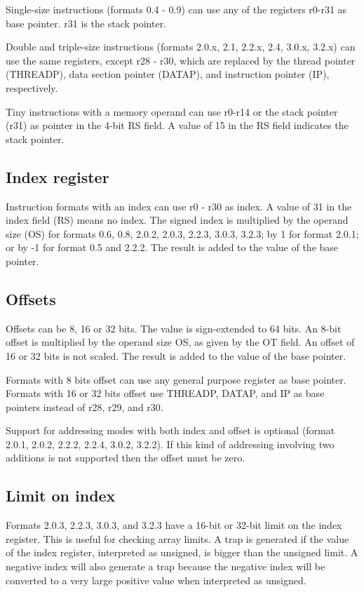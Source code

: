 \documentclass[forwardcom.tex]{subfiles}
\begin{document}
Single-size instructions (formats 0.4 - 0.9) can use any of the registers r0-r31 as base pointer. r31 is the stack pointer.
\vspace{2mm}

Double and triple-size instructions (formats 2.0.x, 2.1, 2.2.x, 2.4, 3.0.x, 3.2.x) can use the same registers, except r28 - r30,  which are replaced by the thread pointer (THREADP), data section pointer (DATAP), and instruction pointer (IP), respectively.
\vspace{2mm}

Tiny instructions with a memory operand can use r0-r14 or the stack pointer (r31) as pointer in the 4-bit RS field. A value of 15 in the RS field indicates the stack pointer.

\subsection{Index register}
Instruction formats with an index can use r0 - r30 as index. A value of 31 in the index field (RS) means no index. The signed index is multiplied by the operand size (OS) for formats 0.6, 0.8, 2.0.2, 2.0.3, 2.2.3, 3.0.3, 3.2.3; by 1 for format 2.0.1; or by -1 for format 0.5 and 2.2.2. The result is added to the value of the base pointer.

\subsection{Offsets}
Offsets can be 8, 16 or 32 bits. The value is sign-extended to 64 bits. An 8-bit offset is multiplied by the operand size OS, as given by the OT field. An offset of 16 or 32 bits is not scaled. The result is added to the value of the base pointer.
\vspace{2mm}

Formats with 8 bits offset can use any general purpose register as base pointer. Formats with 16 or
32 bits offset use THREADP, DATAP, and IP as base pointers instead of r28, r29, and r30.
\vspace{2mm}

Support for addressing modes with both index and offset is optional (format 2.0.1, 2.0.2, 2.2.2, 2.2.4, 3.0.2, 3.2.2). If this kind of addressing involving two additions is not supported then the offset must be zero.

\subsection{Limit on index}
Formats 2.0.3, 2.2.3, 3.0.3, and 3.2.3 have a 16-bit or 32-bit limit on the index register. This is useful for checking array limits. A trap is generated if the value of the index register, interpreted as unsigned, is bigger than the unsigned limit. A negative index will also generate a trap because the negative index will be converted to a very large positive value when interpreted as unsigned.
\end{document}
